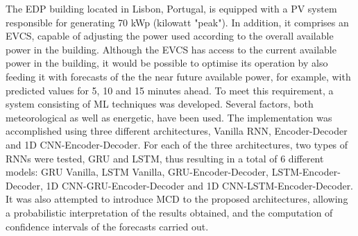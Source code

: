 \noindent The \ac{EDP} building located in Lisbon, Portugal, is equipped with a \ac{PV} system responsible for generating 70 kWp (kilowatt "peak"). In addition, it comprises an \ac{EVCS}, capable of adjusting the power used according to the overall available power in the building. Although the \ac{EVCS} has access to the current available power in the building, it would be possible to optimise its operation by also feeding it with forecasts of the the near future available power, for example, with predicted values for 5, 10 and 15 minutes ahead. To meet this requirement, a system consisting of \ac{ML} techniques was developed. Several factors, both meteorological as well as energetic, have been used. The implementation was accomplished using three different architectures, Vanilla \ac{RNN}, Encoder-Decoder and \ac{1D CNN}-Encoder-Decoder. For each of the three architectures, two types of \ac{RNN}s were tested, \ac{GRU} and \ac{LSTM}, thus resulting in a total of 6 different models: \ac{GRU} Vanilla, \ac{LSTM} Vanilla, \ac{GRU}-Encoder-Decoder, \ac{LSTM}-Encoder-Decoder, \ac{1D CNN}-\ac{GRU}-Encoder-Decoder and \ac{1D CNN}-\ac{LSTM}-Encoder-Decoder. It was also attempted to introduce \ac{MCD} to the proposed architectures, allowing a probabilistic interpretation of the results obtained, and the computation of confidence intervals of the forecasts carried out.
